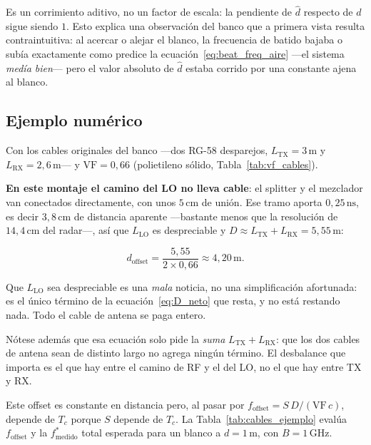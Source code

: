 \documentclass[12pt, a4paper, twoside]{report}
\begin{document}
Es un corrimiento aditivo, no un factor de escala: la pendiente de
$\hat d$ respecto de $d$ sigue siendo $1$. Esto explica una observación
del banco que a primera vista resulta contraintuitiva: al acercar o
alejar el blanco, la frecuencia de batido bajaba o subía exactamente
como predice la ecuación~\eqref{eq:beat_freq_aire} —el sistema
\emph{medía bien}— pero el valor absoluto de $\hat d$ estaba corrido
por una constante ajena al blanco.

\subsection{Ejemplo numérico}
\label{sub:cables_ejemplo}

Con los cables originales del banco ---dos RG-58 desparejos,
$L_\text{TX} = 3\,\text{m}$ y $L_\text{RX} = 2{,}6\,\text{m}$--- y
$\text{VF} = 0{,}66$ (polietileno sólido, Tabla~\ref{tab:vf_cables}).

\textbf{En este montaje el camino del LO no lleva cable}: el splitter y
el mezclador van conectados directamente, con unos $5\,\text{cm}$ de
unión. Ese tramo aporta $0{,}25\,\text{ns}$, es decir $3{,}8\,\text{cm}$
de distancia aparente ---bastante menos que la resolución de
$14{,}4\,\text{cm}$ del radar---, así que $L_\text{LO}$ es despreciable
y $D \approx L_\text{TX} + L_\text{RX} = 5{,}55\,\text{m}$:

\begin{equation*}
  d_\text{offset} = \frac{5{,}55}{2 \times 0{,}66} \approx 4{,}20\,\text{m}.
\end{equation*}

Que $L_\text{LO}$ sea despreciable es una \emph{mala} noticia, no una
simplificación afortunada: es el único término de la
ecuación~\eqref{eq:D_neto} que resta, y no está restando nada. Todo el
cable de antena se paga entero.

Nótese además que esa ecuación solo pide la \emph{suma} $L_\text{TX} +
L_\text{RX}$: que los dos cables de antena sean de distinto largo no
agrega ningún término. El desbalance que importa es el que hay entre el
camino de RF y el del LO, no el que hay entre TX y RX.

Este offset es constante en distancia pero, al pasar por
$f_\text{offset} = S\,D/(\text{VF}\,c)$, depende de $T_c$ porque $S$
depende de $T_c$. La Tabla~\ref{tab:cables_ejemplo} evalúa
$f_\text{offset}$ y la $f^*_\text{medido}$ total esperada para un
blanco a $d = 1\,\text{m}$, con $B = 1\,\text{GHz}$.
\end{document}
